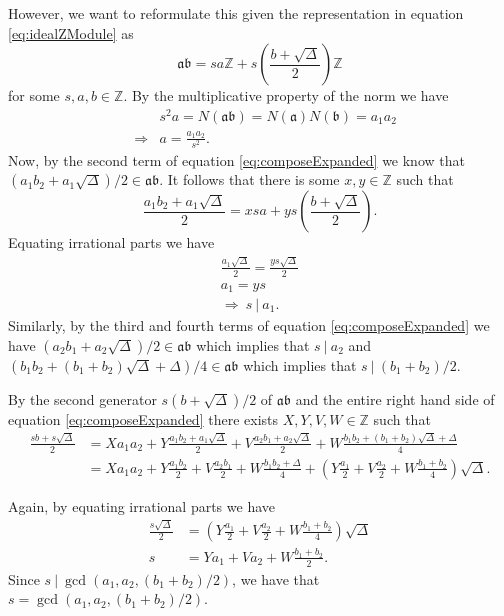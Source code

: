 \documentclass{ucalgthes1}
\theoremstyle{plain}
\theoremstyle{definition}
\newcommand{\ZZ}{\mathbb{Z}}
\begin{document}
\noindent
However, we want to reformulate this given the representation in equation \eqref{eq:idealZModule} as
\[
	\mathfrak{a} \mathfrak{b} = sa \ZZ + s \left(\frac{b + \sqrt{\Delta}}{2}\right) \ZZ
\]
for some $s, a, b \in \ZZ$.  By the multiplicative property of the norm we have
\begin{eqnarray*}
	&& s^2a = N(\mathfrak{a}\mathfrak{b}) = N(\mathfrak{a})N(\mathfrak{b}) = a_1 a_2 \\
	& \Rightarrow & a = \frac{a_1a_2}{s^2}.
\end{eqnarray*}
Now, by the second term of equation \eqref{eq:composeExpanded} we know that $(a_1b_2 + a_1\sqrt{\Delta})/2 \in \mathfrak{a}\mathfrak{b}$.  It follows that there is some $x,y \in \ZZ$ such that
\[
	\frac{a_1b_2 + a_1\sqrt{\Delta}}{2} = xsa + ys\left(\frac{b+\sqrt{\Delta}}{2}\right).
\]
Equating irrational parts we have
\begin{gather*}
	\frac{a_1\sqrt{\Delta}}{2} = \frac{ys\sqrt{\Delta}}{2} \\
	a_1 = ys \\
	\Rightarrow~ s~|~a_1.
\end{gather*}
\noindent
Similarly, by the third and fourth terms of equation \eqref{eq:composeExpanded} we have $(a_2b_1+a_2\sqrt{\Delta})/2 \in \mathfrak{a}\mathfrak{b}$ which implies that $s~|~a_2$ and $(b_1b_2 + (b_1+b_2)\sqrt{\Delta} + \Delta)/4 \in \mathfrak{a}\mathfrak{b}$ which implies that \break $s~|~(b_1+b_2)/2$. 

By the second generator $s(b+\sqrt\Delta)/2$ of $\mathfrak{a}\mathfrak{b}$ and the entire right hand side of equation \eqref{eq:composeExpanded} there exists $X, Y, V, W \in \ZZ$ such that
\begin{equation}
\label{eq:composeSecond}
\begin{split}
	\frac{sb+s\sqrt\Delta}{2} & = Xa_1a_2 + Y\frac{a_1b_2+a_1\sqrt\Delta}{2} + V\frac{a_2b_1 + a_2\sqrt{\Delta}}{2} + W\frac{b_1b_2 + (b_1+b_2)\sqrt{\Delta} + \Delta}{4} \\
	& = Xa_1a_2 + Y\frac{a_1b_2}{2} + V\frac{a_2b_1}{2} + W\frac{b_1b_2 + \Delta}{4} + \left(Y\frac{a_1}{2} + V\frac{a_2}{2} + W\frac{b_1+b_2}{4}\right)\sqrt\Delta. 
\end{split}
\end{equation}

\noindent
Again, by equating irrational parts we have
\begin{align}
	\frac{s\sqrt\Delta}{2} & = \left(Y\frac{a_1}{2} + V\frac{a_2}{2} + W\frac{b_1+b_2}{4}\right)\sqrt\Delta \nonumber \\
	s & = Ya_1 + Va_2 + W\frac{b_1+b_2}{2}. \label{eq:sAsGCD}
\end{align}
Since $s~|~\gcd(a_1, a_2, (b_1+b_2)/2)$, we have that $s = \gcd(a_1, a_2, (b_1+b_2)/2)$.  
\end{document}
